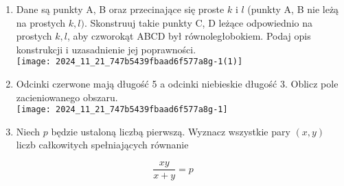 \documentclass[10pt]{article}
\begin{document}
\begin{enumerate}
  \item Dane są punkty A, B oraz przecinające się proste \(k\) i \(l\) (punkty A, B nie leżą na prostych \(k, l)\). Skonstruuj takie punkty C, D leżące odpowiednio na prostych \(k, l\), aby czworokąt ABCD był równoległobokiem. Podaj opis konstrukcji i uzasadnienie jej poprawności.\\
\texttt{[image: 2024\_11\_21\_747b5439fbaad6f577a8g-1(1)]}
  \item Odcinki czerwone mają długość 5 a odcinki niebieskie długość 3. Oblicz pole zacieniowanego obszaru.\\
\texttt{[image: 2024\_11\_21\_747b5439fbaad6f577a8g-1]}
  \item Niech \(p\) będzie ustaloną liczbą pierwszą. Wyznacz wszystkie pary \((x, y)\) liczb całkowitych spełniających równanie
\end{enumerate}

\[
\frac{x y}{x+y}=p
\]
\end{document}
